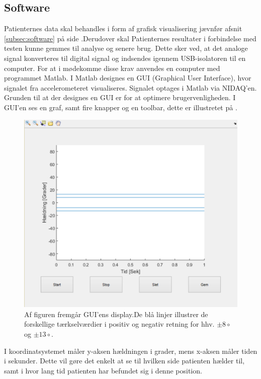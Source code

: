 \subsection{Software}
Patienternes data skal behandles i form af grafisk visualisering jævnfør afsnit \ref{subsec:software} på side \pageref{subsec:software}.Derudover skal Patienternes resultater i forbindelse med testen kunne gemmes til analyse og senere brug. Dette sker ved, at det analoge signal konverteres til digital signal og indsendes igennem USB-isolatoren til en computer. For at i mødekomme disse krav anvendes en computer med programmet Matlab. I Matlab designes en GUI (Graphical User Interface), hvor signalet fra accelerometeret visualiseres. Signalet optages i Matlab via NIDAQ'en. Grunden til at der designes en GUI er for at optimere brugervenligheden. I GUI'en ses en graf, samt fire knapper og en toolbar, dette er illustretet på . 
\begin{figure}[H] 
	\centering 
	\includegraphics[scale=0.5]{figures/cProblemloesning/GUI_generisk.PNG}
	\caption{Af figuren fremgår GUI'ens display.De blå linjer illustrer de forskellige tærkselværdier i positiv og negativ retning for hhv. $\pm 8\circ$ og $\pm 13\circ$.}
	\label{Fig:GUI_generisk}
\end{figure} 
I koordinatsystemet måler y-aksen hældningen i grader, mens x-aksen måler tiden i sekunder. Dette vil gøre det enkelt at se til hvilken side patienten hælder til, samt i hvor lang tid patienten har befundet sig i denne position.
